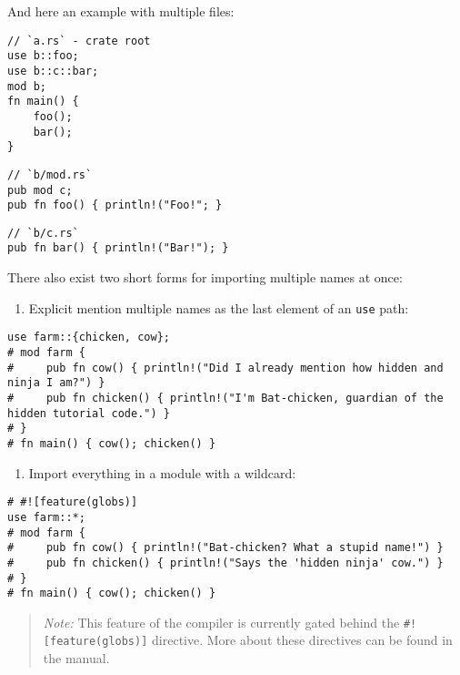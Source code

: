 \documentclass[]{article}
\begin{document}
And here an example with multiple files:

\begin{verbatim}
// `a.rs` - crate root
use b::foo;
use b::c::bar;
mod b;
fn main() {
    foo();
    bar();
}
\end{verbatim}

\begin{verbatim}
// `b/mod.rs`
pub mod c;
pub fn foo() { println!("Foo!"; }
\end{verbatim}

\begin{verbatim}
// `b/c.rs`
pub fn bar() { println!("Bar!"); }
\end{verbatim}

There also exist two short forms for importing multiple names at once:

\begin{enumerate}
\def\labelenumi{\arabic{enumi}.}
\itemsep1pt\parskip0pt
\item
  Explicit mention multiple names as the last element of an \texttt{use}
  path:
\end{enumerate}

\begin{verbatim}
use farm::{chicken, cow};
# mod farm {
#     pub fn cow() { println!("Did I already mention how hidden and ninja I am?") }
#     pub fn chicken() { println!("I'm Bat-chicken, guardian of the hidden tutorial code.") }
# }
# fn main() { cow(); chicken() }
\end{verbatim}

\begin{enumerate}
\def\labelenumi{\arabic{enumi}.}
\setcounter{enumi}{1}
\itemsep1pt\parskip0pt
\item
  Import everything in a module with a wildcard:
\end{enumerate}

\begin{verbatim}
# #![feature(globs)]
use farm::*;
# mod farm {
#     pub fn cow() { println!("Bat-chicken? What a stupid name!") }
#     pub fn chicken() { println!("Says the 'hidden ninja' cow.") }
# }
# fn main() { cow(); chicken() }
\end{verbatim}

\begin{quote}
\emph{Note:} This feature of the compiler is currently gated behind the
\texttt{\#!{[}feature(globs){]}} directive. More about these directives
can be found in the manual.
\end{quote}
\end{document}
